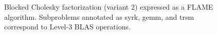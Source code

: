 


\begin{figure}[tbp]
\begin{center}
\footnotesize\FlaAlgorithm
\end{center}
\caption{
Blocked Cholesky factorization (variant 2) expressed as a FLAME algorithm.
Subproblems annotated as {\sc syrk}, {\sc gemm}, and {\sc trsm} correspond
to Level-3 BLAS operations.
}
\label{fig:chol-alg}
\end{figure}
